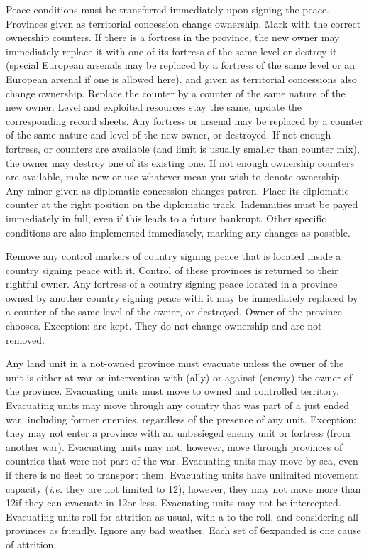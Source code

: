  Peace conditions must be transferred immediately
upon signing the peace.
\bparag Provinces given as territorial concession change ownership. Mark with
the correct ownership counters. If there is a fortress in the province, the new
owner may immediately replace it with one of its fortress of the same level or
destroy it (special European arsenals may be replaced by a fortress of the
same level or an European arsenal if one is allowed here).
\bparag \COL and \TP given as territorial concessions also change
ownership. Replace the counter by a counter of the same nature of the new
owner. Level and exploited resources stay the same, update the corresponding
record sheets. Any fortress or arsenal may be replaced by a counter of the
same nature and level of the new owner, or destroyed.
\bparag If not enough fortress, \COL or \TP counters are available (\COL and
\TP limit is usually smaller than counter mix), the owner may destroy one of
its existing one. If not enough ownership counters are available, make new or
use whatever mean you wish to denote ownership.
\bparag Any minor given as diplomatic concession changes patron. Place its
diplomatic counter at the right position on the diplomatic track.
\bparag Indemnities must be payed immediately in full, even if this leads to a
future bankrupt.
\bparag Other specific conditions are also implemented immediately, marking
any changes as possible.

 Remove any control markers of country signing peace
that is located inside a country signing peace with it. Control of these
provinces is returned to their rightful owner.
\bparag Any fortress of a country signing peace located in a province owned by
another country signing peace with it may be immediately replaced by a counter
of the same level of the owner, or destroyed. Owner of the province chooses.
\bparag Exception: \Presidios are kept. They do not change ownership and are
not removed.

\label{chPeace:Evacuation}
Any land unit in a not-owned province must evacuate unless the owner of the
unit is either at war or intervention with (ally) or against (enemy) the owner
of the province.
\bparag Evacuating units must move to owned and controlled territory.
\bparag Evacuating units may move through any country that was part of a just
ended war, including former enemies, regardless of the presence of any unit.
\bparag Exception: they may not enter a province with an unbesieged enemy unit
or fortress (from another war).
\bparag Evacuating units may not, however, move through provinces of countries
that were not part of the war.
\bparag Evacuating units may move by sea, even if there is no fleet to
transport them.
\bparag Evacuating units have unlimited movement capacity (\emph{i.e.} they
are not limited to 12\MP), however, they may not move more than 12\MP if they
can evacuate in 12\MP or less.
\bparag Evacuating units may not be intercepted.
\bparag Evacuating units roll for attrition as usual, with a  to the
roll, and considering all provinces as friendly. Ignore any bad weather. Each
set of 6\MP expanded is one cause of attrition.

